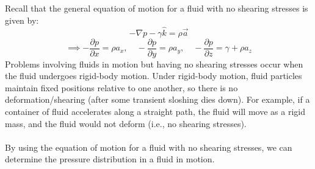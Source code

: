 ﻿\documentclass[12pt]{article}
\begin{document}
\section*{}
Recall that the general equation of motion for a fluid with no shearing stresses is given by:
\[-\nabla p - \gamma \hat{k} = \rho \vec{a}\]
\[\implies -\frac{\partial p}{\partial x} = \rho a_x , \quad -\frac{\partial p}{\partial y} = \rho a_y , \quad -\frac{\partial p}{\partial z} = \gamma +\rho a_z \]
Problems involving fluids in motion but having no shearing stresses occur when the fluid undergoes rigid-body motion. Under rigid-body motion, fluid particles maintain fixed positions relative to one another, so there is no deformation/shearing (after some transient sloshing dies down). For example, if a container of fluid accelerates along a straight path, the fluid will move as a rigid mass, and the fluid would not deform (i.e., no shearing stresses).\\\\
By using the equation of motion for a fluid with no shearing stresses, we can determine the pressure distribution in a fluid in motion.
\newpage
\end{document}
